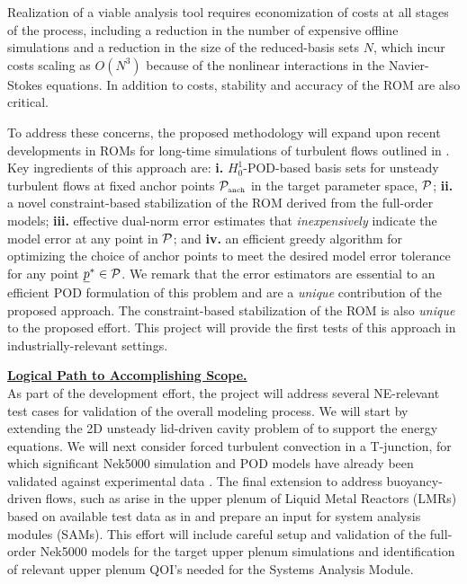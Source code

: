 Realization of a viable analysis tool requires economization of costs at all
stages of the process, including a reduction in the number of expensive
offline simulations and a reduction in the size of the
reduced-basis sets $N$, which incur costs scaling as $O(N^3)$ because 
of the nonlinear interactions in the Navier-Stokes equations.
In addition to costs, stability and accuracy of the ROM are also critical.

  To address these concerns, the proposed methodology will expand upon recent
developments in ROMs for long-time simulations of turbulent flows outlined in
\cite{fick18}.  Key ingredients of this approach are:
 \textbf{i.} $H^1_0$-POD-based basis sets for unsteady turbulent flows
         at fixed anchor points $\mathcal{P}_{\mbox{\tiny anch}}$ in the target
         parameter space, $\mathcal{P}$;
 \textbf{ii.} a novel constraint-based stabilization of the ROM derived
          from the full-order models;
 \textbf{iii.} effective dual-norm error estimates that {\em inexpensively}
           indicate the model error at any point in $\mathcal{P}$; and
 \textbf{iv.} an efficient greedy algorithm for optimizing the choice of
          anchor points to meet the desired model error tolerance 
          for any point ${\underline p}^* \in \mathcal{P}$.
We remark that the error estimators are essential to an efficient POD
formulation of this problem and are a {\em unique} contribution of the proposed
approach.  The constraint-based stabilization of the ROM is also {\em unique}
to the proposed effort.  This project will provide the first tests of this
approach in industrially-relevant settings.   

\vspace*{.08in}\noindent \underline{\textbf{ Logical Path to Accomplishing Scope.}} \\[-2ex]

As part of the development effort, the project will address several NE-relevant
test cases for validation of the overall modeling process.  We will start by
extending the 2D unsteady lid-driven cavity problem of \cite{fick18} to support
the energy equations.  We will next consider forced turbulent convection in a
T-junction, for which significant Nek5000 simulation and POD models have
already been validated against experimental data \cite{merzari11b}.
The final extension to address buoyancy-driven flows, such as arise in
the upper plenum
of Liquid Metal Reactors (LMRs) \cite{mbd1,mbd2,mbd3} based on available test data
as in \cite{mbd4} and prepare an input for system analysis modules (SAMs).  This
effort will include careful setup and validation of the full-order Nek5000 models 
for the target upper plenum simulations and identification of relevant 
upper plenum QOI's needed for the Systems Analysis Module.
\\[-1ex]



